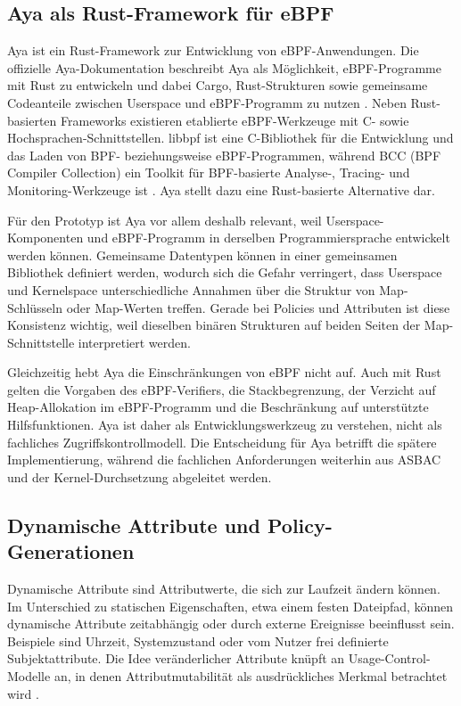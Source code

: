 \subsection{Aya als Rust-Framework für eBPF}\label{sec:aya}
Aya ist ein Rust-Framework zur Entwicklung von eBPF-Anwendungen. 
Die offizielle Aya-Dokumentation beschreibt Aya als Möglichkeit, eBPF-Programme mit Rust zu entwickeln und dabei Cargo, Rust-Strukturen sowie gemeinsame Codeanteile zwischen Userspace und eBPF-Programm zu nutzen \citep{ayaBook}. 
Neben Rust-basierten Frameworks existieren etablierte eBPF-Werkzeuge mit C- sowie Hochsprachen-Schnittstellen.
libbpf ist eine C-Bibliothek für die Entwicklung und das Laden von BPF- beziehungsweise eBPF-Programmen, während BCC (BPF Compiler Collection) ein Toolkit für BPF-basierte Analyse-, Tracing- und Monitoring-Werkzeuge ist \citep{libbpf,bcc}.
Aya stellt dazu eine Rust-basierte Alternative dar.

Für den Prototyp ist Aya vor allem deshalb relevant, weil Userspace-Komponenten und eBPF-Programm in derselben Programmiersprache entwickelt werden können. 
Gemeinsame Datentypen können in einer gemeinsamen Bibliothek definiert werden, wodurch sich die Gefahr verringert, dass Userspace und Kernelspace unterschiedliche Annahmen über die Struktur von Map-Schlüsseln oder Map-Werten treffen. 
Gerade bei Policies und Attributen ist diese Konsistenz wichtig, weil dieselben binären Strukturen auf beiden Seiten der Map-Schnittstelle interpretiert werden.

Gleichzeitig hebt Aya die Einschränkungen von eBPF nicht auf. 
Auch mit Rust gelten die Vorgaben des eBPF-Verifiers, die Stackbegrenzung, der Verzicht auf Heap-Allokation im eBPF-Programm und die Beschränkung auf unterstützte Hilfsfunktionen. 
Aya ist daher als Entwicklungswerkzeug zu verstehen, nicht als fachliches Zugriffskontrollmodell. 
Die Entscheidung für Aya betrifft die spätere Implementierung, während die fachlichen Anforderungen weiterhin aus ASBAC und der Kernel-Durchsetzung abgeleitet werden.

\subsection{Dynamische Attribute und Policy-Generationen}
Dynamische Attribute sind Attributwerte, die sich zur Laufzeit ändern können. 
Im Unterschied zu statischen Eigenschaften, etwa einem festen Dateipfad, können dynamische Attribute zeitabhängig oder durch externe Ereignisse beeinflusst sein. 
Beispiele sind Uhrzeit, Systemzustand oder vom Nutzer frei definierte Subjektattribute. 
Die Idee veränderlicher Attribute knüpft an Usage-Control-Modelle an, in denen Attributmutabilität als ausdrückliches Merkmal betrachtet wird \citep[S.~52]{gouglidis2018usecon}.


